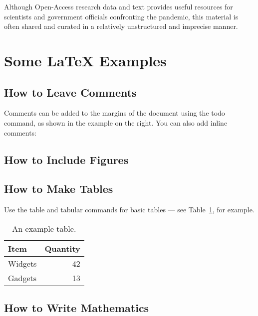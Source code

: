 \documentclass{statsoc}
\begin{document}
 

 



Although Open-Access research data and text provides 
useful resources for scientists and government 
officials confronting the pandemic, this material 
is often shared and curated in a relatively unstructured 
and imprecise manner.  


\section{Some \LaTeX{} Examples}
\label{sec:examples}

\subsection{How to Leave Comments}

Comments can be added to the margins of the document using the  todo command, as shown in the example on the right. You can also add inline comments:


\subsection{How to Include Figures}

\subsection{How to Make Tables}

Use the table and tabular commands for basic tables --- see Table~\ref{tab:widgets}, for example.

\begin{table}
\caption{\label{tab:widgets}An example table.}
\centering
\begin{tabular}{l|r}
Item & Quantity \\\hline
Widgets & 42 \\
Gadgets & 13
\end{tabular}
\end{table}

\subsection{How to Write Mathematics}
\end{document}

